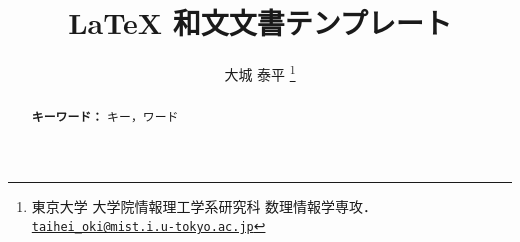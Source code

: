 \documentclass[11pt, a4paper, dvipdfmx, uplatex]{jsarticle}
\title{\LaTeX{} 和文文書テンプレート}
\author{大城 泰平%
  \texorpdfstring{\footnote{
    東京大学 大学院情報理工学系研究科 数理情報学専攻．
    \href{mailto:taihei_oki@mist.i.u-tokyo.ac.jp}{\nolinkurl{taihei_oki@mist.i.u-tokyo.ac.jp}}
  }}{Introduction}
}
\newcommand{\mykeywords}{キー，ワード}
\begin{document}
\maketitle

\begin{abstract}
  

  \bigskip\noindent\textbf{キーワード：} \mykeywords{}
\end{abstract}





\end{document}
